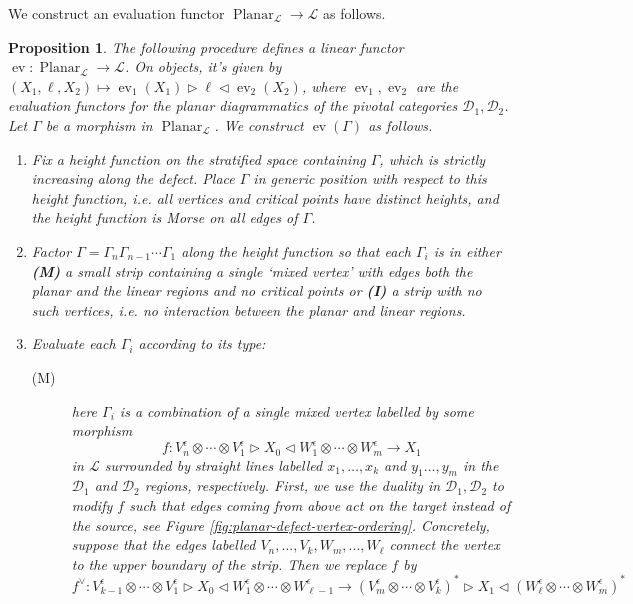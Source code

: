 \documentclass[a4paper]{article}
\numberwithin{equation}{section}
\newtheorem{proposition}[counter]{Proposition}
\newcommand{\1}{{\mathrm{1}\mkern-4mu{\mathchoice{}{}{\mskip-0.5mu}{\mskip-1mu}}\mathrm{l}}}
\DeclareMathOperator{\ev}{ev}
\newcommand{\D}{\mathcal{D}}
\renewcommand{\L}{\mathcal{L}}
\DeclareMathOperator{\Planar}{Planar} %
\begin{document}
We construct an evaluation functor $\Planar_\L \to \L$ as follows.
\begin{proposition}\label{prop:planar-defect-evaluation}
The following procedure defines a linear functor $\ev : \Planar_\L \to \L$. On objects, it's given by $(X_1,\ell,X_2) \mapsto \ev_1(X_1) \triangleright \ell \triangleleft \ev_2(X_2)$, where $\ev_1,\ev_2$ are the evaluation functors for the planar diagrammatics of the pivotal categories $\D_1,\D_2$.  
Let $\Gamma$ be a morphism in $\Planar_\L$. We construct $\ev(\Gamma)$ as follows. 
\begin{enumerate}
  \item Fix a height function on the stratified space containing $\Gamma$, which is strictly increasing along the defect. Place $\Gamma$ in generic position with respect to this height function, i.e. all vertices and critical points have distinct heights, and the height function is Morse on all edges of $\Gamma$.
  \item Factor $\Gamma = \Gamma_n\Gamma_{n-1} \cdots \Gamma_1$ along the height function so that each $\Gamma_i$ is in either \emph{\bf(M)} a small strip containing a single `mixed vertex' with edges both the planar and the linear regions and no critical points or \emph{\bf(I)} a strip with no such vertices, i.e. no interaction between the planar and linear regions.
  \item Evaluate each $\Gamma_i$ according to its type:
    \begin{description}
      \item[(M)] here $\Gamma_i$ is a combination of a single mixed vertex labelled by some morphism 
        \begin{equation}
          f: V_n^\epsilon\otimes\cdots\otimes V_1^\epsilon \triangleright X_0 \triangleleft W_1^\epsilon\otimes \cdots \otimes W_m^\epsilon \to X_1 
        \end{equation}
        in $\L$ surrounded by straight lines labelled $x_1,\ldots,x_k$ and $y_1\ldots,y_m$ in the $\D_1$ and $\D_2$ regions, respectively. 
        First, we use the duality in $\D_1,\D_2$ to modify $f$ such that edges coming from above act on the target instead of the source, see Figure \ref{fig:planar-defect-vertex-ordering}.
        Concretely, suppose that the edges labelled $V_n,..., V_{k}, W_m,...,W_\ell$ connect the vertex to the upper boundary of the strip. Then we replace $f$ by
        \begin{equation}
          f^\vee: V_{k-1}^\epsilon\otimes\cdots\otimes V_1^\epsilon \triangleright X_0 \triangleleft W_1^\epsilon\otimes \cdots \otimes W_{\ell-1}^\epsilon \to \left(V_{m}^\epsilon\otimes\cdots\otimes V_k^\epsilon\right)^* \triangleright X_1 \triangleleft \left(W_\ell^\epsilon\otimes \cdots \otimes W_{m}^\epsilon\right)^* 
        \end{equation}


\end{description}
\end{enumerate}
\end{proposition}
\end{document}
